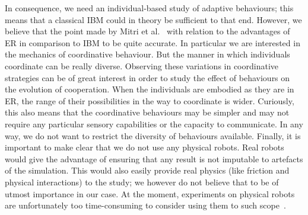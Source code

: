     In consequence, we need an individual-based study of adaptive behaviours; this means that a classical IBM could in theory be sufficient to that end. However, we believe that the point made by Mitri et al.~\parencite{Mitri2012} with relation to the advantages of ER in comparison to IBM to be quite accurate. In particular we are interested in the mechanics of coordinative behaviour. But the manner in which individuals coordinate can be really diverse. Observing these variations in coordinative strategies can be of great interest in order to study the effect of behaviours on the evolution of cooperation. When the individuals are embodied as they are in ER, the range of their possibilities in the way to coordinate is wider. Curiously, this also means that the coordinative behaviours may be simpler and may not require any particular sensory capabilities or the capacity to communicate. In any way, we do not want to restrict the diversity of behaviours available. Finally, it is important to make clear that we do not use any physical robots. Real robots would give the advantage of ensuring that any result is not imputable to artefacts of the simulation. This would also easily provide real physics (like friction and physical interactions) to the study; we however do not believe that to be of utmost importance in our case. At the moment, experiments on physical robots are unfortunately too time-consuming to consider using them to such scope~\parencite{Mitri2012, Doncieux2015}.



